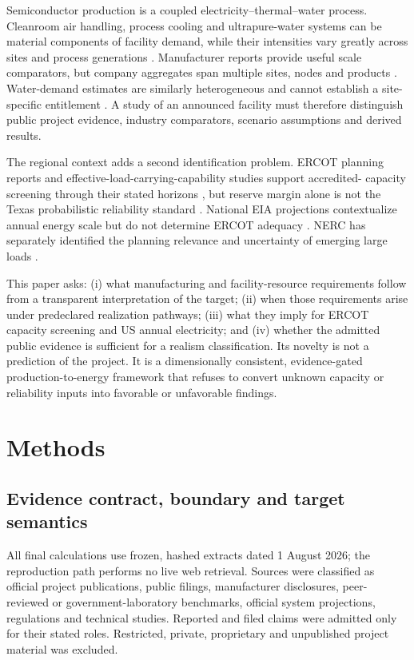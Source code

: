 \documentclass[11pt]{article}
\begin{document}
Semiconductor production is a coupled electricity--thermal--water process.
Cleanroom air handling, process cooling and ultrapure-water systems can be
material components of facility demand, while their intensities vary greatly
across sites and process generations \cite{Hu2019,Mathew2010,Tschudi2003}.
Manufacturer reports provide useful scale comparators, but company aggregates
span multiple sites, nodes and products \cite{TSMCAnnual2024,TSMCSustainability2024}.
Water-demand estimates are similarly heterogeneous and cannot establish a
site-specific entitlement \cite{Sandhu2025}. A study of an announced facility
must therefore distinguish public project evidence, industry comparators,
scenario assumptions and derived results.

The regional context adds a second identification problem. ERCOT planning
reports and effective-load-carrying-capability studies support accredited-
capacity screening through their stated horizons \cite{ERCOTCDR2025,ERCOTELCC2024},
but reserve margin alone is not the Texas probabilistic reliability standard
\cite{PUCT25508}. National EIA projections contextualize annual energy scale
but do not determine ERCOT adequacy \cite{EIAAEO2026}. NERC has separately
identified the planning relevance and uncertainty of emerging large loads
\cite{NERCLTRA2025,NERCLargeLoads2025}.

This paper asks: (i) what manufacturing and facility-resource requirements
follow from a transparent interpretation of the target; (ii) when those
requirements arise under predeclared realization pathways; (iii) what they
imply for ERCOT capacity screening and US annual electricity; and (iv) whether
the admitted public evidence is sufficient for a realism classification. Its
novelty is not a prediction of the project. It is a dimensionally consistent,
evidence-gated production-to-energy framework that refuses to convert unknown
capacity or reliability inputs into favorable or unfavorable findings.

\section{Methods}
\label{sec:methods}

\subsection{Evidence contract, boundary and target semantics}

All final calculations use frozen, hashed extracts dated 1 August 2026; the
reproduction path performs no live web retrieval. Sources were classified as
official project publications, public filings, manufacturer disclosures,
peer-reviewed or government-laboratory benchmarks, official system
projections, regulations and technical studies. Reported and filed claims were
admitted only for their stated roles. Restricted, private, proprietary and
unpublished project material was excluded.
\end{document}
